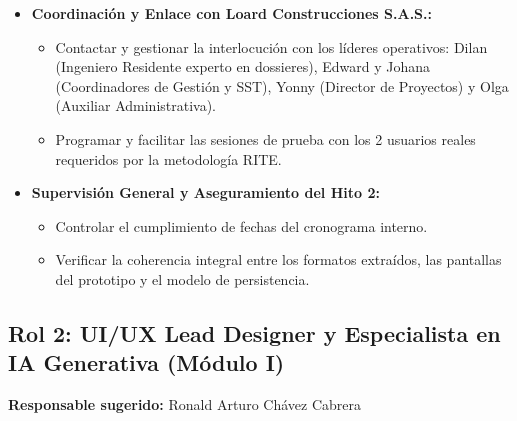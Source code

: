 \documentclass[11pt,letterpaper]{article}
\begin{document}
\begin{itemize}
\begin{itemize}
    \end{itemize}
    \item \textbf{Coordinación y Enlace con Loard Construcciones S.A.S.:}
    \begin{itemize}
        \item Contactar y gestionar la interlocución con los líderes operativos: Dilan (Ingeniero Residente experto en dossieres), Edward y Johana (Coordinadores de Gestión y SST), Yonny (Director de Proyectos) y Olga (Auxiliar Administrativa).
        \item Programar y facilitar las sesiones de prueba con los 2 usuarios reales requeridos por la metodología RITE.
    \end{itemize}
    \item \textbf{Supervisión General y Aseguramiento del Hito 2:}
    \begin{itemize}
        \item Controlar el cumplimiento de fechas del cronograma interno.
        \item Verificar la coherencia integral entre los formatos extraídos, las pantallas del prototipo y el modelo de persistencia.
    \end{itemize}
\end{itemize}

\subsection{Rol 2: UI/UX Lead Designer y Especialista en IA Generativa (Módulo I)}
\textbf{Responsable sugerido:} Ronald Arturo Chávez Cabrera
\end{document}
